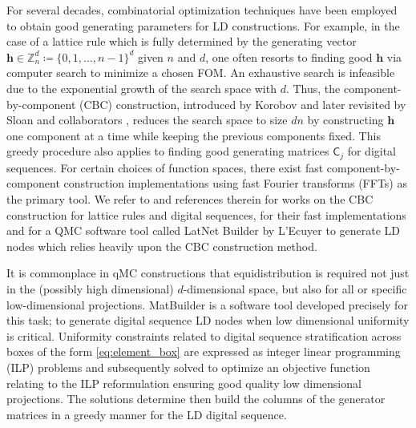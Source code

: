 \documentclass{svproc}
\begin{document}
For several decades, combinatorial optimization techniques have been employed to obtain good generating parameters for LD constructions. For example, in the case of a lattice rule which is fully determined by the generating vector \(\boldsymbol{h} \in \mathbb{Z}_n^d \coloneqq \{0, 1, \ldots, n-1\}^d\) given $n$ and $d$, 
one often resorts to finding good $\boldsymbol{h}$ via computer search to minimize a chosen FOM. An exhaustive search is infeasible due to the exponential growth of the search space with \(d\). Thus, the component-by-component (CBC) construction, introduced by Korobov \cite{kor63} and later revisited by Sloan and collaborators \cite{Slo02}, reduces the search space to size \(dn\) by constructing \(\boldsymbol{h}\) one component at a time while keeping the previous components fixed. This greedy procedure also applies to finding good generating matrices $\mathsf{C}_j$ for digital sequences.
For certain choices of function spaces, there exist fast component-by-component construction implementations using fast Fourier transforms (FFTs) as the primary tool. We refer to \cite{DicKuo04a,JoeKuo03,KuoJoe02b} and references therein for works on the CBC construction for lattice rules and digital sequences, \cite{NuyCoo06a,NuyCoo06b} for their fast implementations and \cite{LatNet} for a QMC software tool called LatNet Builder by L'Ecuyer to generate LD nodes which relies heavily upon the CBC construction method.


It is commonplace in qMC constructions that equidistribution is required not just in the (possibly high dimensional) $d$-dimensional space, but also for all or specific low-dimensional projections. MatBuilder \cite{paulin2022} is a software tool developed precisely for this task; to generate digital sequence LD nodes when low dimensional uniformity is critical. Uniformity constraints related to digital sequence stratification across boxes of the form \eqref{eq:element_box} are expressed as integer linear programming (ILP) problems and subsequently solved to optimize an objective function relating to the ILP reformulation ensuring good quality low dimensional projections. The solutions determine then build the columns of the generator matrices in a greedy manner for the LD digital sequence.
\end{document}
